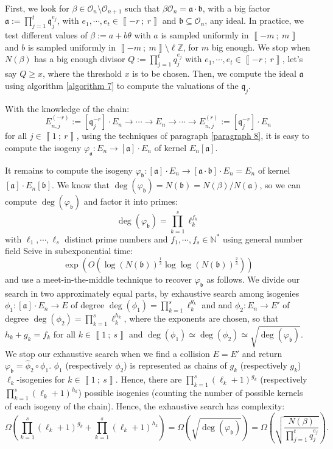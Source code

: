 \documentclass[a4paper,10pt]{report}
\theoremstyle{definition}
\theoremstyle{plain}
\theoremstyle{definition}
\newcommand{\N}{\mathbb{N}}
\newcommand{\Z}{\mathbb{Z}}
\newcommand{\mO}{\mathcal{O}}
\renewcommand{\i}[2]{\left\llbracket #1~;~#2\right\rrbracket}
\renewcommand{\(}{\left(}
\renewcommand{\)}{\right)}
\newcommand{\mf}[1]{\mathfrak{#1}}
\begin{document}
First, we look for $\beta\in\mO_n\setminus\mO_{n+1}$ such that $\beta\mO_n=\mf{a}\cdot \mf{b}$, with a big factor $\mf{a}:=\prod_{j=1}^t\mf{q}_j^{e_j}$, with $e_1, \cdots, e_t\in\i{-r}{r}$ and $\mf{b}\subseteq\mO_n$, any ideal. In practice, we test different values of $\beta:=a+b\theta$ with $a$ is sampled uniformly in $\i{-m}{m}$ and $b$ is sampled uniformly in $\i{-m}{m}\setminus\ell\Z$, for $m$ big enough. We stop when $N(\beta)$ has a big enough divisor $Q:=\prod_{j=1}^t q_j^{e_j}$ with $e_1, \cdots, e_t\in\i{-r}{r}$, let's say $Q\geq x$, where the threshold $x$ is to be chosen. Then, we compute the ideal $\mf{a}$ using algorithm \ref{algorithm 7} to compute the valuations of the $\mf{q}_j$.  

With the knowledge of the chain: 
\[E_{n,j}^{(-r)}:=[\mf{q}_j^{-r}]\cdot E_n\longrightarrow \cdots \longrightarrow E_{n}\longrightarrow \cdots\longrightarrow E_{n,j}^{(r)}:=[\mf{q}_j^{-r}]\cdot E_n\]
for all $j\in\i{1}{r}$, using the techniques of paragraph \ref{paragraph 8}, it is easy to compute the isogeny $\varphi_{\mf{a}}:E_n\longrightarrow [\mf{a}]\cdot E_n$ of kernel $E_n[\mf{a}]$. 

It remains to compute the isogeny $\varphi_{\mf{b}}:[\mf{a}]\cdot E_n\longrightarrow [\mf{a}\cdot\mf{b}]\cdot E_n=E_n$ of kernel $[\mf{a}]\cdot E_n[\mf{b}]$.  We know that $\deg(\varphi_{\mf{b}})=N(\mf{b})=N(\beta)/N(\mf{a})$, so we can compute $\deg(\varphi_{\mf{b}})$ and factor it into primes:
\[\deg(\varphi_{\mf{b}})=\prod_{k=1}^s\ell_k^{f_k}\]
with $\ell_1,\cdots, \ell_s$ distinct prime numbers and $f_1,\cdots, f_s\in\N^*$ using general number field Seive in subexponential time:
\[\exp\(O\(\log(N(\mf{b}))^{\frac{1}{3}}\log\log(N(\mf{b}))^{\frac{2}{3}}\)\)\] 
and use a meet-in-the-middle technique to recover $\varphi_{\mf{b}}$ as follows. We divide our search in two approximately equal parts, by exhaustive search among isogenies $\phi_1 : [\mf{a}]\cdot E_n\longrightarrow E$ of degree $\deg(\phi_1)=\prod_{k=1}^s\ell_k^{g_k}$ and and $\phi_2 : E_n\longrightarrow E'$ of degree $\deg(\phi_2)=\prod_{k=1}^s\ell_k^{h_k}$, where the exponents are chosen, so that $h_k+g_k=f_k$ for all $k\in\i{1}{s}$ and $\deg(\phi_1)\simeq\deg(\phi_2)\simeq\sqrt{\deg(\varphi_{\mf{b}})}$. We stop our exhaustive search when we find a collision $E=E'$ and return $\varphi_{\mf{b}}=\widehat{\phi}_2\circ\phi_1$. $\phi_1$ (respectively $\phi_2$) is represented as chains of $g_k$ (respectively $g_k$) $\ell_k$-isogenies for $k\in\i{1}{s}$. Hence, there are $\prod_{k=1}^s(\ell_k+1)^{g_k}$ (respectively $\prod_{k=1}^s(\ell_k+1)^{h_k}$) possible isogenies (counting the number of possible kernels of each isogeny of the chain). Hence, the exhaustive search has complexity:
\[\Omega\(\prod_{k=1}^s(\ell_k+1)^{g_k}+\prod_{k=1}^s(\ell_k+1)^{h_k}\)=\Omega(\sqrt{\deg(\varphi_{\mf{b}})})=\Omega\(\sqrt{\frac{N(\beta)}{\prod_{j=1}^t q_j^{e_j}}}\).\]
\end{document}
